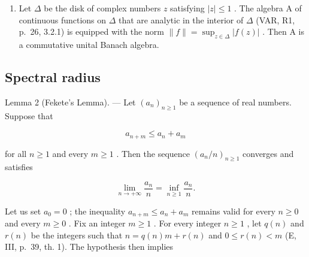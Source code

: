 \begin{enumerate}
One checks that \(\varphi\) is a morphism of \(\mathrm{L}_{\mathbf{C}}^{1}(\mathbf{Z})\) onto an algebra A of continuous functions on \(\mathbf{U}\) , multiplication in A being the usual multiplication. Integrating the equality term by term

\[
\left(\sum_ {m \in {\bf Z}} c _ {m} e ^ {i m t}\right) \cdot e ^ {- i n t} = \varphi (x) (e ^ {i t}) \cdot e ^ {- i n t},
\]

it comes

\[
c _ {n} = \frac {1}{2 \pi} \int_ {0} ^ {1} \varphi (x) (e ^ {i t}) e ^ {- i n t} d t.
\]

In particular, it follows that the morphism \(\varphi\) is injective. The algebra A, endowed with the norm induced by that of \(\mathrm{L}_{\mathbf{C}}^{1}(\mathbf{Z})\) via \(\varphi\) , is called the Banach algebra of absolutely convergent Fourier series. It admits as identity element the function \(1 = \varphi(\varepsilon)\) .

\item
  Let \(\Delta\) be the disk of complex numbers \(z\) satisfying \(|z| \leqslant 1\) . The algebra A of continuous functions on \(\Delta\) that are analytic in the interior of \(\Delta\) (VAR, R1, p.~26, 3.2.1) is equipped with the norm \(\|f\| = \sup_{z \in \Delta} |f(z)|\) . Then A is a commutative unital Banach algebra.
\end{enumerate}

\subsection{Spectral radius}

Lemma 2 (Fekete's Lemma). --- Let \((a_{n})_{n\geqslant1}\) be a sequence of real numbers. Suppose that

\[
a _ {n + m} \leqslant a _ {n} + a _ {m}
\]

for all \(n \geqslant 1\) and every \(m \geqslant 1\) . Then the sequence \((a_n / n)_{n \geqslant 1}\) converges and satisfies

\[
\lim _ {n \to + \infty} \frac {a _ {n}}{n} = \inf _ {n \geqslant 1} \frac {a _ {n}}{n}.
\]

Let us set \(a_0 = 0\) ; the inequality \(a_{n+m} \leqslant a_n + a_m\) remains valid for every \(n \geqslant 0\) and every \(m \geqslant 0\) . Fix an integer \(m \geqslant 1\) . For every integer \(n \geqslant 1\) , let \(q(n)\) and \(r(n)\) be the integers such that \(n = q(n)m + r(n)\) and \(0 \leqslant r(n) < m\) (E, III, p.~39, th. 1). The hypothesis then implies

